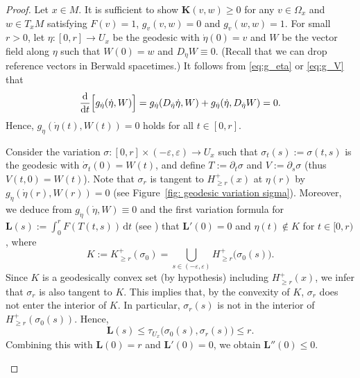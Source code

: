 \documentclass[a4paper,11pt]{article}
\numberwithin{equation}{section}
\theoremstyle{definition}
\theoremstyle{plain}
\newcommand{\del}{\partial}
\newcommand{\lra}{\longrightarrow}
\newcommand{\ve}{\varepsilon}
\newcommand{\bK}{\mathbf{K}}
\newcommand{\bL}{\mathbf{L}}
\newcommand{\dd}{\mathrm{d}}
\begin{document}
\begin{proof}
Let $x \in M$.
It is sufficient to show $\bK(v,w) \ge 0$ for any $v \in \Omega_x$ and $w \in T_xM$ satisfying $F(v)=1$, $g_v(v,w)=0$ and $g_v(w,w)=1$.
For small $r>0$, let $\eta\colon [0,r] \lra U_x$ be the geodesic with $\dot{\eta}(0)=v$ and $W$ be the vector field along $\eta$ such that $W(0)=w$ and $D_{\dot{\eta}}W \equiv 0$.
(Recall that we can drop reference vectors in Berwald spacetimes.)
It follows from \eqref{eq:g_eta} or \eqref{eq:g_V} that
\[
\frac{\dd}{\dd t} \Bigl[ g_{\dot{\eta}}(\dot{\eta},W) \Bigr] =g_{\dot{\eta}}(D_{\dot{\eta}} \dot{\eta},W) +g_{\dot{\eta}}(\dot{\eta},D_{\dot{\eta}} W)=0.
\]
Hence, $g_{\dot{\eta}}(\dot{\eta}(t),W(t))=0$ holds for all $t \in [0,r]$.

Consider the variation $\sigma\colon [0,r] \times (-\ve,\ve) \lra U_x$ such that $\sigma_t(s):=\sigma(t,s)$ is the geodesic with $\dot{\sigma}_t(0)=W(t)$, and define $T:=\del_t \sigma$ and $V:=\del_s \sigma$ (thus $V(t,0)=W(t)$).
Note that $\sigma_r$ is tangent to $H_{\ge r}^+(x)$ at $\eta(r)$ by $g_{\dot{\eta}}(\dot{\eta}(r),W(r))=0$ (see Figure~\ref{fig: geodesic variation sigma}).
Moreover, we deduce from $g_{\dot{\eta}}(\dot{\eta},W) \equiv 0$ and the first variation formula for $\bL(s):=\int_0^r F(T(t,s)) \,\dd t$ (see \cite[Lemma~2.6]{BO}) that $\bL'(0)=0$
and $\eta(t) \not\in K$ for $t \in [0,r)$, where
\[ K:=K_{\ge r}^+(\sigma_0) 
=\bigcup_{s \in (-\ve,\ve)}H_{\ge r}^+\bigl( \sigma_0(s) \bigr). \]
Since $K$ is a geodesically convex set (by hypothesis) including $H_{\ge r}^+(x)$, we infer that $\sigma_r$ is also tangent to $K$.
This implies that, by the convexity of $K$, $\sigma_r$ does not enter the interior of $K$.
In particular, $\sigma_r(s)$ is not in the interior of $H_{\ge r}^+(\sigma_0(s))$.
Hence, 
\[ \bL(s) \le \tau_{U_x}\bigl( \sigma_0(s),\sigma_r(s) \bigr) \le r. \]
Combining this with $\bL(0)=r$ and $\bL'(0)=0$, we obtain $\bL''(0) \le 0$.


\begin{figure}
\begin{center}
\end{center}
\end{figure}
\end{proof}
\end{document}
